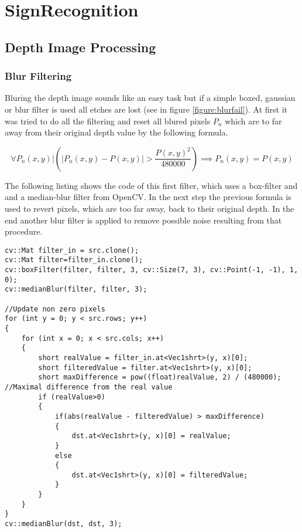 \chapter{SignRecognition}
\graphicspath{{./Software/img/}}
 
\section{Depth Image Processing}


\subsection{Blur Filtering}
Bluring the depth image sounds like an easy task but 
if a simple boxed, gaussian or blur filter is used all etches are lost (see in figure \vref{figure:blurfail}).
At first it was tried to do all the filtering and reset all blured pixels $P_n$ which are to far away from their 
original depth value by the following formula.

\[
 \forall P_n(x,y)  |   \left(\left|{P_n(x,y)-P(x,y)}\right|>{\frac{P(x,y)^2}{480000}}\right)\implies P_n(x,y)=P(x,y)
\]

The following listing shows the code of this first filter, which uses a box-filter and and a median-blur filter from
OpenCV. In the next step the previous formula is used to revert pixels, which are too far away, back to their original depth.
In the end another blur filter is applied to remove possible noise resulting from that procedure.

{
\tiny
\newpage
\begin{lstlisting}
cv::Mat filter_in = src.clone();
cv::Mat filter=filter_in.clone();
cv::boxFilter(filter, filter, 3, cv::Size(7, 3), cv::Point(-1, -1), 1, 0);
cv::medianBlur(filter, filter, 3);

//Update non zero pixels
for (int y = 0; y < src.rows; y++)
{
	for (int x = 0; x < src.cols; x++)
	{
		short realValue = filter_in.at<Vec1shrt>(y, x)[0];
		short filteredValue = filter.at<Vec1shrt>(y, x)[0];
		short maxDifference = pow((float)realValue, 2) / (480000); //Maximal difference from the real value
		if (realValue>0)
		{
			if(abs(realValue - filteredValue) > maxDifference)
			{
				dst.at<Vec1shrt>(y, x)[0] = realValue;
			}
			else
			{
				dst.at<Vec1shrt>(y, x)[0] = filteredValue;
			}
		}
	}
}
cv::medianBlur(dst, dst, 3);

\end{lstlisting}
}






